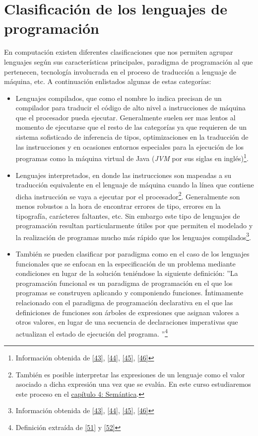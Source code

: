 \section{Clasificación de los lenguajes de programación}

    En computación existen diferentes clasificaciones que nos permiten agrupar lenguajes según sus características principales, paradigma de programación al que pertenecen, tecnología involucrada en el proceso de traducción a lenguaje de máquina, etc. A continuación enlistados algunas de estas categorías: 

    \begin{itemize}
        \item Lenguajes compilados,  que como el nombre lo indica precisan de un compilador para traducir el código de alto nivel a instrucciones de máquina que el procesador pueda ejecutar. Generalmente suelen ser mas lentos al momento de ejecutarse que el resto de las categorías  ya que requieren de un sistema sofisticado de inferencia de tipos, optimizaciones en la traducción de las instrucciones y en ocasiones entornos especiales para la ejecución de los programas como la máquina virtual de Java (\textit{JVM} por sus siglas en inglés)\footnote{Información obtenida de \hyperlink{43}{[43]}, \hyperlink{44}{[44]}, \hyperlink{45}{[45]}, \hyperlink{46}{[46]}}.\\

        \item Lenguajes interpretados, en donde las instrucciones son mapeadas a su traducción equivalente en el lenguaje de máquina cuando la línea que contiene dicha instrucción se vaya a ejecutar por el procesador\footnote{También es posible interpretar las expresiones de un lenguaje como el valor asociado a dicha expresión una vez que se evalúa. En este curso estudiaremos este proceso en el \hyperref[sec:semantics]{capítulo 4: Semántica}.}. Generalmente son menos robustos a la hora de encontrar errores de tipo, errores en la tipografía, carácteres faltantes, etc. Sin embargo este tipo de lenguajes de programación resultan particularmente útiles por que permiten el modelado y la realización de programas mucho más rápido que los lenguajes compilados\footnote{Información obtenida de \hyperlink{43}{[43]}, \hyperlink{44}{[44]}, \hyperlink{45}{[45]}, \hyperlink{46}{[46]}}.\\

        \item También se pueden clasificar por paradigma como en el caso de los lenguajes funcionales que se enfocan en la especificación de un problema mediante condiciones en lugar de la solución teniéndose la siguiente definición: 
         ''La programación funcional es un paradigma de programación en el que los programas se construyen aplicando y componiendo funciones. Íntimamente relacionado con el paradigma de programación declarativa en el que las definiciones de funciones son árboles de expresiones que asignan valores a otros valores, en lugar de una secuencia de declaraciones imperativas que actualizan el estado de ejecución del programa. ''\footnote{Definición extraída de \hyperlink{51}{[51]} y \hyperlink{52}{[52]}}\\


\end{itemize}
